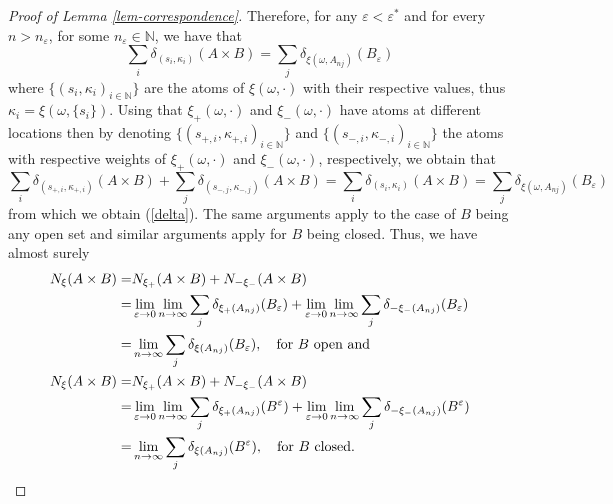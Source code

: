 \documentclass{article}
\theoremstyle{plain}
\theoremstyle{remark}
\begin{document}
\begin{proof}[Proof of Lemma \ref{lem-correspondence}]
	Therefore, for any $\varepsilon<\varepsilon^*$ and for every $n>n_\varepsilon$, for some $n_\varepsilon\in\mathbb{N}$, we have that 
	\begin{equation*}
		\sum_{i}\delta_{(s_i,\kappa_i)}(A\times B)=\sum_{j}\delta_{\xi(\omega,A_{nj})}(B_{\varepsilon})
	\end{equation*}
	where $\{(s_i,\kappa_i)_{i\in\mathbb{N}}\}$ are the atoms of $\xi(\omega,\cdot)$ with their respective values, thus $\kappa_i=\xi(\omega,\{s_i\})$. Using that $\xi_+(\omega,\cdot)$ and $\xi_-(\omega,\cdot)$ have atoms at different locations then by denoting $\{(s_{+,i},\kappa_{+,i})_{i\in\mathbb{N}}\}$ and $\{(s_{-,i},\kappa_{-,i})_{i\in\mathbb{N}}\}$ the atoms with respective weights of $\xi_+(\omega,\cdot)$ and $\xi_-(\omega,\cdot)$, respectively, we obtain that
	\begin{equation*}
		\sum_{i}\delta_{(s_{+,i},\kappa_{+,i})}(A\times B)+\sum_{j}\delta_{(s_{-,j},\kappa_{-,j})}(A\times B)=\sum_{i}\delta_{(s_i,\kappa_i)}(A\times B)=\sum_{j}\delta_{\xi(\omega,A_{nj})}(B_{\varepsilon})
	\end{equation*}
	from which we obtain (\ref{delta}). The same arguments apply to the case of $B$ being any open set and similar arguments apply for $B$ being closed. Thus, we have almost surely 
	\begin{align*}
		N_{\xi}(A\times B)=&N_{\xi_+}(A\times B)+N_{-\xi_-}(A\times B)\\
		=&\lim\limits_{\varepsilon\to 0}\lim\limits_{n\to\infty}\sum_{j}\delta_{\xi_+(A_{nj})}(B_\varepsilon)+	\lim\limits_{\varepsilon\to0}\lim\limits_{n\to\infty}\sum_{j}\delta_{-\xi_-(A_{nj})}(B_\varepsilon)\\
		=&\lim\limits_{n\to\infty}\sum_{j}\delta_{\xi(A_{nj})}(B_\varepsilon),\quad\textnormal{for $B$ open and}\\
		N_{\xi}(A\times B)=&N_{\xi_+}(A\times B)+N_{-\xi_-}(A\times B)\\
		=&\lim\limits_{\varepsilon\to 0}\lim\limits_{n\to\infty}\sum_{j}\delta_{\xi_+(A_{nj})}(B^\varepsilon)+\lim\limits_{\varepsilon\to 0}\lim\limits_{n\to\infty}\sum_{j}\delta_{-\xi_-(A_{nj})}(B^\varepsilon)\\
		=&\lim\limits_{n\to\infty}\sum_{j}\delta_{\xi(A_{nj})}(B^\varepsilon),\quad\textnormal{for $B$ closed.}
	\end{align*}
\end{proof}
\end{document}
